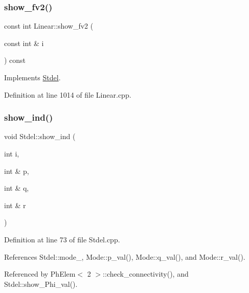 \subsubsection{\texorpdfstring{show\+\_\+fv2()}{show\_fv2()}}
{\footnotesize\ttfamily const int Linear\+::show\+\_\+fv2 (\begin{DoxyParamCaption}\item[{const int \&}]{i }\end{DoxyParamCaption}) const\hspace{0.3cm}{\ttfamily [virtual]}}



Implements \hyperlink{classStdel_a67f16a65f02fc8a5aa10274539bd1ad8}{Stdel}.



Definition at line 1014 of file Linear.\+cpp.

\mbox{\label{classStdel_a20afd536025caf1aad1c4e3f41fcb866}} 
\subsubsection{\texorpdfstring{show\+\_\+ind()}{show\_ind()}}
{\footnotesize\ttfamily void Stdel\+::show\+\_\+ind (\begin{DoxyParamCaption}\item[{int}]{i,  }\item[{int \&}]{p,  }\item[{int \&}]{q,  }\item[{int \&}]{r }\end{DoxyParamCaption})\hspace{0.3cm}{\ttfamily [inherited]}}



Definition at line 73 of file Stdel.\+cpp.



References Stdel\+::mode\+\_\+, Mode\+::p\+\_\+val(), Mode\+::q\+\_\+val(), and Mode\+::r\+\_\+val().



Referenced by Ph\+Elem$<$ 2 $>$\+::check\+\_\+connectivity(), and Stdel\+::show\+\_\+\+Phi\+\_\+val().

